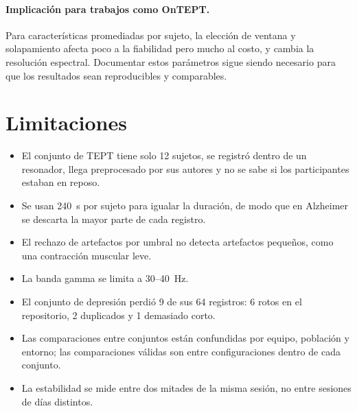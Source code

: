 \documentclass[11pt,a4paper]{article}
\begin{document}
\paragraph{Implicación para trabajos como OnTEPT.} Para características promediadas por sujeto, la elección de ventana y solapamiento afecta poco a la fiabilidad pero mucho al costo, y cambia la resolución espectral. Documentar estos parámetros sigue siendo necesario para que los resultados sean reproducibles y comparables.

\section{Limitaciones}
\begin{itemize}
  \item El conjunto de TEPT tiene solo 12 sujetos, se registró dentro de un resonador, llega preprocesado por sus autores y no se sabe si los participantes estaban en reposo.
  \item Se usan 240~s por sujeto para igualar la duración, de modo que en Alzheimer se descarta la mayor parte de cada registro.
  \item El rechazo de artefactos por umbral no detecta artefactos pequeños, como una contracción muscular leve.
  \item La banda gamma se limita a 30--40~Hz.
  \item El conjunto de depresión perdió 9 de sus 64 registros: 6 rotos en el repositorio, 2 duplicados y 1 demasiado corto.
  \item Las comparaciones entre conjuntos están confundidas por equipo, población y entorno; las comparaciones válidas son entre configuraciones dentro de cada conjunto.
  \item La estabilidad se mide entre dos mitades de la misma sesión, no entre sesiones de días distintos.
\end{itemize}

\end{document}
